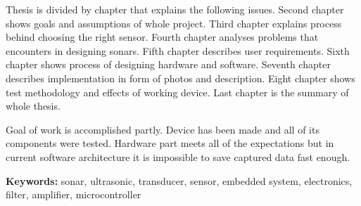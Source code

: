Thesis is divided by chapter that explains the following issues. Second chapter shows goals and assumptions of whole project. 
Third chapter explains process behind choosing the right sensor. 
Fourth chapter analyses problems that encounters in designing sonars.
Fifth chapter describes user requirements.
Sixth chapter shows process of designing hardware and software.
Seventh chapter describes implementation in form of photos and description.
Eight chapter shows test methodology and effects of working device.
Last chapter is the summary of whole thesis.

Goal of work is accomplished partly. Device has been made and all of its components were tested. 
Hardware part meets all of the expectations but in current software architecture it is impossible to save captured data fast enough.

\textbf{Keywords: }sonar, ultrasonic, transducer, sensor, embedded system, electronics, filter, amplifier, microcontroller 